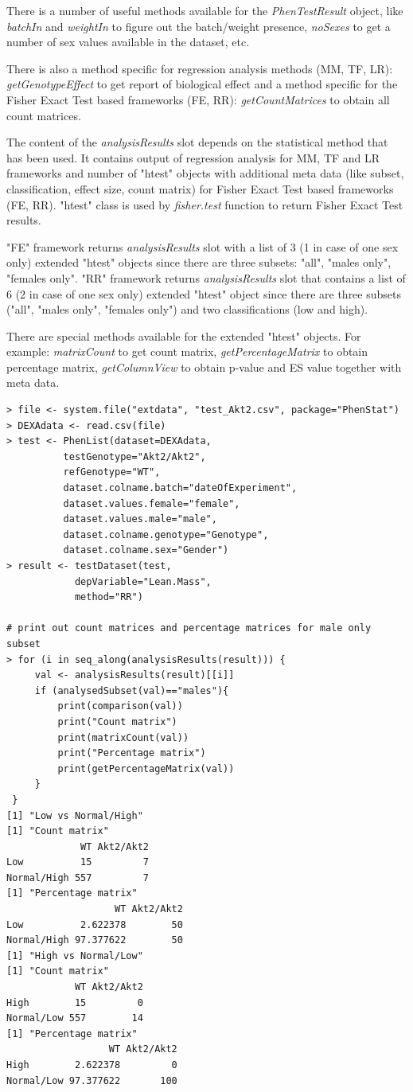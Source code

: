 \documentclass[12pt,a4paper]{article}
\begin{document}
There is a number of useful methods available for the \textit{PhenTestResult} object, like \textit{batchIn} and \textit{weightIn} to figure out the batch/weight presence, \textit{noSexes} to get a number of sex values available in the dataset, etc.

There is also a method specific for regression analysis methods (MM, TF, LR): \textit{getGenotypeEffect} to get report of biological effect and a method specific for the Fisher Exact Test based frameworks (FE, RR): \textit{getCountMatrices} to obtain all count matrices.

The content of the \textit{analysisResults} slot depends on the statistical method that has been used. It contains output of regression analysis for MM, TF and LR frameworks and number of "htest" objects with additional meta data (like subset, classification, effect size, count matrix) for  
Fisher Exact Test based frameworks (FE, RR). "htest" class  is used by \textit{fisher.test} function to return Fisher Exact Test results.

"FE" framework returns \textit{analysisResults} slot with  a list of 3 (1 in case of one sex only) extended "htest" objects since there are three subsets: "all", "males only", "females only".
"RR" framework returns \textit{analysisResults} slot that contains a list of 6 (2 in case of one sex only) extended "htest" object since there are three subsets ("all", "males only", "females only") and two classifications (low and high).

There are special methods available for the extended "htest" objects. For example: \textit{matrixCount} to get count matrix, \textit{getPercentageMatrix} to obtain percentage matrix, \textit{getColumnView} to obtain p-value and ES value together with meta data.

\begingroup
    \fontsize{8pt}{12pt}\selectfont
\begin{verbatim}
> file <- system.file("extdata", "test_Akt2.csv", package="PhenStat") 
> DEXAdata <- read.csv(file)
> test <- PhenList(dataset=DEXAdata,
		  testGenotype="Akt2/Akt2",
		  refGenotype="WT",
		  dataset.colname.batch="dateOfExperiment",
		  dataset.values.female="female",
		  dataset.values.male="male", 
		  dataset.colname.genotype="Genotype", 
		  dataset.colname.sex="Gender")
> result <- testDataset(test, 
			depVariable="Lean.Mass", 
			method="RR")
			
# print out count matrices and percentage matrices for male only subset			
> for (i in seq_along(analysisResults(result))) {
     val <- analysisResults(result)[[i]]
     if (analysedSubset(val)=="males"){
     	 print(comparison(val))
     	 print("Count matrix")
         print(matrixCount(val))   
         print("Percentage matrix")
         print(getPercentageMatrix(val))     
     }
 }
[1] "Low vs Normal/High"
[1] "Count matrix"
             WT Akt2/Akt2
Low          15         7
Normal/High 557         7
[1] "Percentage matrix"
                   WT Akt2/Akt2
Low          2.622378        50
Normal/High 97.377622        50
[1] "High vs Normal/Low"
[1] "Count matrix"
            WT Akt2/Akt2
High        15         0
Normal/Low 557        14
[1] "Percentage matrix"
                  WT Akt2/Akt2
High        2.622378         0
Normal/Low 97.377622       100
\end{verbatim}
\endgroup 
\end{document}
